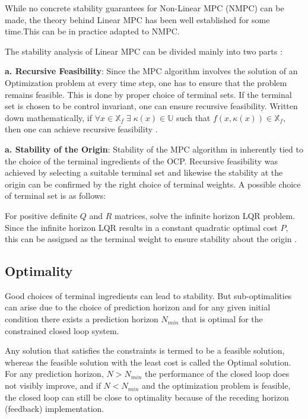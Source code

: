 While no concrete stability guarantees for Non-Linear MPC (NMPC) can be made, the theory behind Linear MPC has been well established for some time.This can be in practice adapted to NMPC.

The stability analysis of Linear MPC can be divided mainly into two parts :

\textbf{a. Recursive Feasibility}: Since the MPC algorithm involves the solution of an Optimization problem at every time step, one has to ensure that the problem remains feasible. This is done by proper choice of terminal sets. If the terminal set is chosen to be control invariant, one can ensure recursive feasibility. Written down mathematically, if  $\forall x \in \mathbb{X}_f \; \exists \;  \kappa(x) \in \mathbb{U} $ such that  $ f(x, \kappa(x)) \in \mathbb{X}_f $, then one can achieve recursive feasibility \cite{Fang2022, Allgower2004}. 

\textbf{a. Stability of the Origin}: Stability of the MPC algorithm in inherently tied to the choice of the terminal ingredients of the OCP. Recursive feasibility was achieved by selecting a suitable terminal set and likewise the stability at the origin can be confirmed by the right choice of terminal weights. 
A possible choice of terminal set is as follows: 

For positive definite $Q$ and $R$ matrices, solve the infinite horizon LQR problem. Since the infinite horizon LQR results in a constant quadratic optimal cost $P$, this can be assigned as the terminal weight to ensure stability about the origin \cite{Fang2022,Rawlings2017,Allgower2004}.

\subsection{Optimality}

Good choices of terminal ingredients can lead to stability. But sub-optimalities can arise due to the choice of prediction horizon and for any given initial condition there exists a prediction horizon $N_{min}$ that is optimal for the constrained closed loop system.

Any solution that satisfies the constraints is termed to be a feasible solution, whereas the feasible solution with the least cost is called the Optimal solution. 
For any prediction horizon, $N > N_{min}$ the performance of the closed loop does not visibly improve, and if  $N < N_{min}$ and the optimization problem is feasible, the closed loop can still be close to optimality because of the receding horizon (feedback) implementation.
 

  
\clearpage

